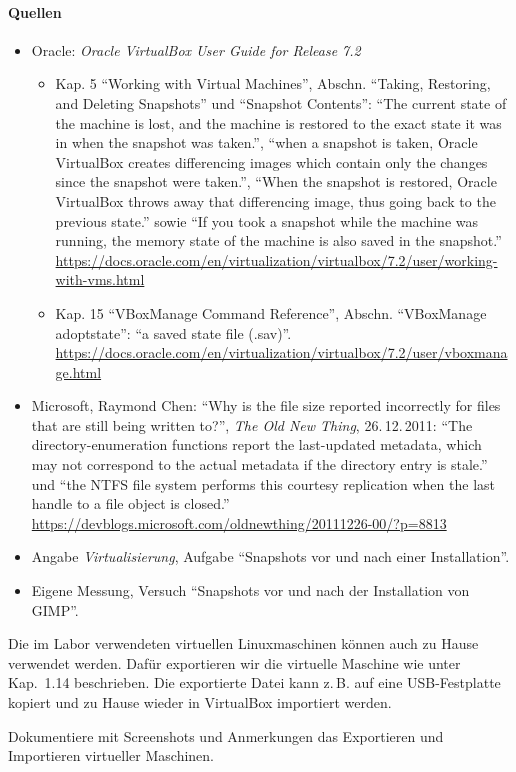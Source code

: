 \paragraph{Quellen}
\begin{itemize}[quellen]
  \item Oracle: \emph{Oracle VirtualBox User Guide for Release 7.2}
  \begin{itemize}[nosep]
    \item Kap. 5 \enquote{Working with Virtual Machines}, Abschn. \enquote{Taking, Restoring, and Deleting Snapshots} und \enquote{Snapshot Contents}: \enquote{The current state of the machine is lost, and the machine is restored to the exact state it was in when the snapshot was taken.}, \enquote{when a snapshot is taken, Oracle VirtualBox creates differencing images which contain only the changes since the snapshot were taken.}, \enquote{When the snapshot is restored, Oracle VirtualBox throws away that differencing image, thus going back to the previous state.} sowie \enquote{If you took a snapshot while the machine was running, the memory state of the machine is also saved in the snapshot.} \url{https://docs.oracle.com/en/virtualization/virtualbox/7.2/user/working-with-vms.html}
    \item Kap. 15 \enquote{VBoxManage Command Reference}, Abschn. \enquote{VBoxManage adoptstate}: \enquote{a saved state file (.sav)}. \url{https://docs.oracle.com/en/virtualization/virtualbox/7.2/user/vboxmanage.html}
  \end{itemize}
  \item Microsoft, Raymond Chen: \enquote{Why is the file size reported incorrectly for files that are still being written to?}, \emph{The Old New Thing}, 26.\,12.\,2011: \enquote{The directory-enumeration functions report the last-updated metadata, which may not correspond to the actual metadata if the directory entry is stale.} und \enquote{the NTFS file system performs this courtesy replication when the last handle to a file object is closed.} \url{https://devblogs.microsoft.com/oldnewthing/20111226-00/?p=8813}
  \item Angabe \emph{Virtualisierung}, Aufgabe \enquote{Snapshots vor und nach einer Installation}.
  \item Eigene Messung, Versuch \enquote{Snapshots vor und nach der Installation von GIMP}.
\end{itemize}

\begin{aufgabe}
Die im Labor verwendeten virtuellen Linuxmaschinen können auch zu Hause verwendet werden. Dafür exportieren wir die virtuelle Maschine wie unter Kap.~1.14 beschrieben. Die exportierte Datei kann z.\,B. auf eine USB-Festplatte kopiert und zu Hause wieder in VirtualBox importiert werden.

Dokumentiere mit Screenshots und Anmerkungen das Exportieren und Importieren virtueller Maschinen.
\end{aufgabe}
\label{sec:export}

